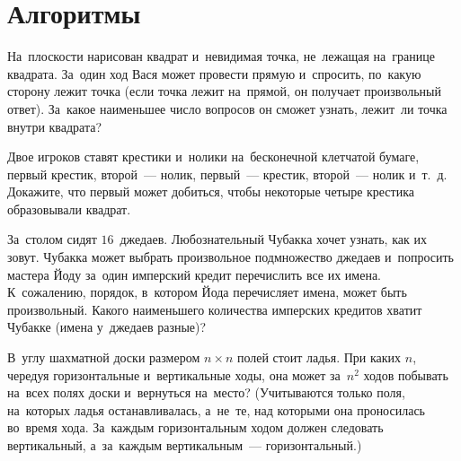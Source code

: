 
\section*{Алгоритмы}



\begin{problems}


\item
На~плоскости нарисован квадрат и~невидимая точка, не~лежащая на~границе
квадрата.
За~один ход Вася может провести прямую и~спросить, по~какую сторону лежит точка
(если точка лежит на~прямой, он получает произвольный ответ).
За~какое наименьшее число вопросов он сможет узнать, лежит~ли точка внутри
квадрата?

\item
Двое игроков ставят крестики и~нолики на~бесконечной клетчатой бумаге, первый
крестик, второй~--- нолик, первый~--- крестик, второй~--- нолик и~т.~д.
Докажите, что первый может добиться, чтобы некоторые четыре крестика
образовывали квадрат.

\item
За~столом сидят $16$~джедаев.
Любознательный Чубакка хочет узнать, как их зовут.
Чубакка может выбрать произвольное подмножество джедаев и~попросить
мастера Йоду за~один имперский кредит перечислить все их имена.
К~сожалению, порядок, в~котором Йода перечисляет имена, может быть
произвольный.
Какого наименьшего количества имперских кредитов хватит Чубакке
(имена у~джедаев разные)?

\item
В~углу шахматной доски размером $n \times n$ полей стоит ладья.
При каких $n$, чередуя горизонтальные и~вертикальные ходы, она может за~$n^2$
ходов побывать на~всех полях доски и~вернуться на~место?
(Учитываются только поля, на~которых ладья останавливалась, а~не~те, над
которыми она проносилась во~время хода.
За~каждым горизонтальным ходом должен следовать вертикальный, а~за~каждым
вертикальным~--- горизонтальный.)


\end{problems}
